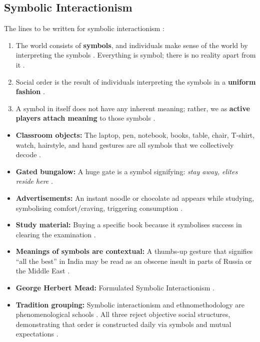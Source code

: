 \subsection{Symbolic Interactionism}
The lines to be written for symbolic interactionism :
\begin{enumerate}
    \item The world consists of \textbf{symbols}, and individuals make sense of the world by interpreting the symbols . Everything is symbol; there is no reality apart from it .
    \item Social order is the result of individuals interpreting the symbols in a \textbf{uniform fashion} .
    \item A symbol in itself does not have any inherent meaning; rather, we as \textbf{active players attach meaning} to those symbols .
\end{enumerate}

\begin{ExampleBox}
\begin{itemize}
    \item \textbf{Classroom objects:} The laptop, pen, notebook, books, table, chair, T-shirt, watch, hairstyle, and hand gestures are all symbols that we collectively decode .
    \item \textbf{Gated bungalow:} A huge gate is a symbol signifying: \textit{stay away, elites reside here} .
    \item \textbf{Advertisements:} An instant noodle or chocolate ad appears while studying, symbolising comfort/craving, triggering consumption .
    \item \textbf{Study material:} Buying a specific book because it symbolises success in clearing the examination .
\end{itemize}
\end{ExampleBox}

\begin{CriticalPoint}
\begin{itemize}
    \item \textbf{Meanings of symbols are contextual:} A thumbs-up gesture that signifies ``all the best'' in India may be read as an obscene insult in parts of Russia or the Middle East .
    \item \textbf{George Herbert Mead:} Formulated Symbolic Interactionism .
    \item \textbf{Tradition grouping:} Symbolic interactionism and ethnomethodology are phenomenological schools . All three reject objective social structures, demonstrating that order is constructed daily via symbols and mutual expectations .
\end{itemize}
\end{CriticalPoint}

